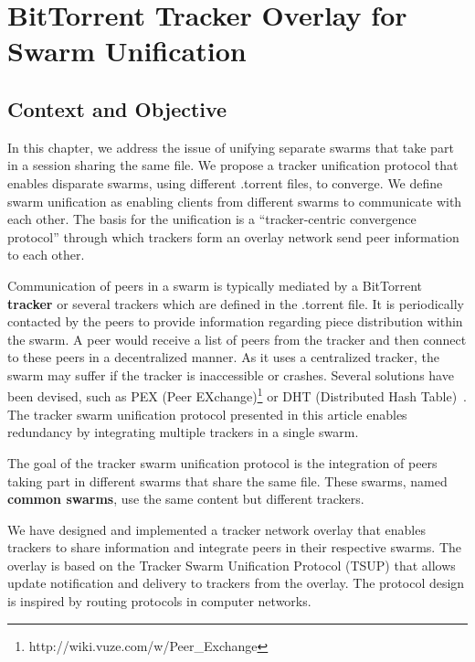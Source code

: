 
\chapter{BitTorrent Tracker Overlay for Swarm Unification}
\label{chapter:unified-tracker}




\section{Context and Objective}
\label{sec:unified-tracker:context}

In this chapter, we address the issue of unifying separate swarms that take
part in a session sharing the same file. We propose a tracker unification
protocol that enables disparate swarms, using different .torrent files, to
converge. We define swarm unification as enabling clients from different
swarms to communicate with each other. The basis for the unification is a
``tracker-centric convergence protocol'' through which trackers form an
overlay network send peer information to each other.

Communication of peers in a swarm is typically mediated by a BitTorrent
\textbf{tracker} or several trackers which are defined in the .torrent file.
It is periodically contacted by the peers to provide information regarding
piece distribution within the swarm. A peer would receive a list of peers from
the tracker and then connect to these peers in a decentralized manner. As it
uses a centralized tracker, the swarm may suffer if the tracker is
inaccessible or crashes. Several solutions have been devised, such as PEX
(Peer EXchange)\footnote{http://wiki.vuze.com/w/Peer\_Exchange} or DHT
(Distributed Hash Table)~\cite{dht-paper}. The tracker swarm unification
protocol presented in this article enables redundancy by integrating multiple
trackers in a single swarm.

The goal of the tracker swarm unification protocol is the integration of peers
taking part in different swarms that share the same file. These swarms, named
\textbf{common swarms}, use the same content but different trackers.

We have designed and implemented a tracker network overlay that enables
trackers to share information and integrate peers in their respective swarms.
The overlay is based on the Tracker Swarm Unification Protocol (TSUP) that
allows update notification and delivery to trackers from the overlay. The
protocol design is inspired by routing protocols in computer networks.

